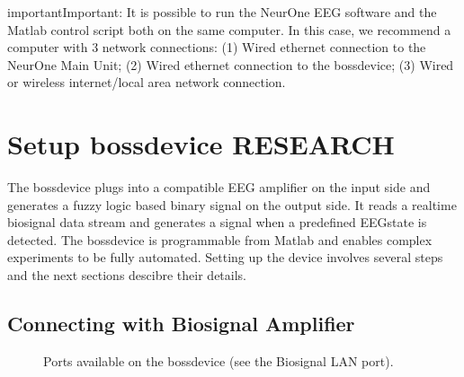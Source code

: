 \documentclass[letterpaper,10pt,english]{sphinxmanual}
\begin{document}
\begin{sphinxadmonition}{important}{Important:}
\sphinxAtStartPar
It is possible to run the NeurOne EEG software and the Matlab control script both on the same computer. In this case, we recommend a computer with 3 network connections: (1) Wired ethernet connection to the NeurOne Main Unit; (2) Wired ethernet connection to the bossdevice; (3) Wired or wireless internet/local area network connection.
\end{sphinxadmonition}


\chapter{Setup bossdevice RESEARCH}
\label{\detokenize{2_setup_bossdevice_research:setup-bossdevice-research}}\label{\detokenize{2_setup_bossdevice_research::doc}}
\sphinxAtStartPar
The bossdevice plugs into a compatible EEG amplifier on the input side and generates a fuzzy logic based binary signal on the output side. It reads a real\sphinxhyphen{}time biosignal data stream and generates a  signal when a pre\sphinxhyphen{}defined EEG\sphinxhyphen{}state is detected. The bossdevice is programmable from Matlab and enables complex experiments to be fully automated. Setting up the device involves several steps and the next sections descibre their details.


\section{Connecting with Biosignal Amplifier}
\label{\detokenize{2_setup_bossdevice_research:connecting-with-biosignal-amplifier}}
\begin{figure}[htbp]
\centering
\capstart

\noindent{}
\caption{Ports available on the bossdevice (see the Biosignal LAN port).}\label{\detokenize{2_setup_bossdevice_research:id1}}\end{figure}
\end{document}
